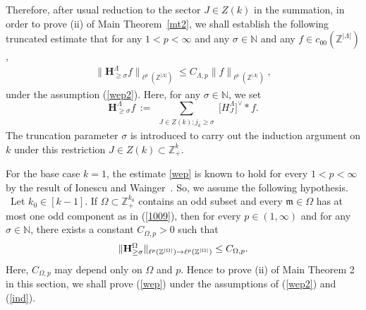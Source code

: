\documentclass[10pt,a4paper]{amsart}
\numberwithin{equation}{section}
\begin{document}
Therefore, after usual reduction to the sector \(J\in Z(k)\) in the summation, in order to prove (ii) of Main Theorem~\ref{mt2},
we shall establish the following truncated estimate  that for any $1<p<\infty$ and any $\sigma\in\mathbb{N}$ and any  $f\in c_{00}(\mathbb{Z}^{|\Lambda|})$,  
\begin{align}\label{wep}
	\|\mathbf{H}_{\ge \sigma}^{\Lambda} f\|_{\ell^p(\mathbb{Z}^{|\Lambda|})}
	\leq
	C_{\Lambda,p}
	\|f\|_{\ell^p(\mathbb{Z}^{|\Lambda|})},
\end{align} 
under the assumption (\ref{wep2}).  Here,  for any $\sigma\in\mathbb{N}$, we set \[
\mathbf{H}_{\ge \sigma}^{\Lambda} f
\,:=\,
\sum_{\substack{J\in Z(k); j_k\ge \sigma}}
\bigl[ H_J^{\Lambda} \bigr]^{\vee} * f.
\]
The truncation parameter $\sigma$  is introduced to carry out the induction argument on $k$ under this restriction $J\in Z(k)\subset \mathbb Z_+^k$.

For the base case $k=1$, the estimate \eqref{wep} is known to hold for every $1<p<\infty$ by the result of Ionescu and Wainger~\cite{IW}.
 So, we assume the following hypothesis.
\\

\    Let $k_0\in[k-1].$ If  $\Omega \subset \mathbb{Z}_+^{k_0}$ contains an odd subset and 
 every $\mathfrak{m} \in \Omega$ has at most one odd component as in (\ref{1009}),  then for every $p \in (1,\infty)$ and for any $\sigma\in\mathbb{N}$, 
there exists a constant $C_{\Omega,p} > 0$ such that
\begin{align}\label{ind}
	\| {\bf H}_{\ge \sigma}^{\Omega} \|_{\ell^p(\mathbb{Z}^{|\Omega|}) \to \ell^p(\mathbb{Z}^{|\Omega|})}
	\le C_{\Omega,p}.
\end{align}
Here, $C_{\Omega,p}$ may depend only on $\Omega$ and $p$. Hence to prove (ii) of Main Theorem 2 in this section, we shall prove (\ref{wep}) under the assumptions of   (\ref{wep2}) and  (\ref{ind}).


 
 
\end{document}
